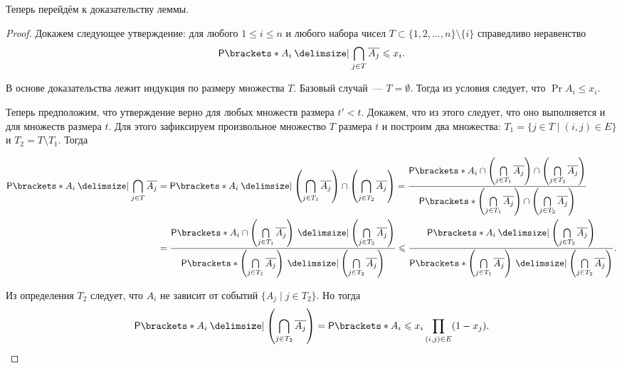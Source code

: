 Теперь перейдём к доказательству леммы.
\begin{proof}
    Докажем следующее утверждение: для любого \(1 \leq i \leq n\) и любого набора чисел \(T \subset \{1, 2, \dots, n\} \setminus \{i\}\) справедливо неравенство \[\Pr{A_i \given \bigcap_{j \in T} \overline{A_j}} \leq x_i.\]
    
    В основе доказательства лежит индукция по размеру множества \(T\). Базовый случай~--- \(T = \emptyset\). Тогда из условия следует, что \(\Pr{A_i} \leq x_i\).
    
    Теперь предположим, что утверждение верно для любых множеств размера \(t' < t\). Докажем, что из этого следует, что оно выполняется и для множеств размера \(t\). Для этого зафиксируем произвольное множество \(T\) размера \(t\) и построим два множества: \(T_1 = \{j \in T \mid (i, j) \in E\}\) и \(T_2 = T \setminus T_1\). Тогда
    
    \[\begin{aligned}
    \Pr{A_i \given \bigcap_{j \in T} \overline{A_j}} &= \Pr{A_i \given \left(\bigcap_{j \in T_1} \overline{A_j}\right) \cap \left(\bigcap_{j \in T_2} \overline{A_j}\right)}
    = \frac{\Pr{A_i \cap \left(\bigcap\limits_{j \in T_1} \overline{A_j}\right) \cap \left(\bigcap\limits_{j \in T_2} \overline{A_j}\right)}}{\Pr{\left(\bigcap\limits_{j \in T_1} \overline{A_j}\right) \cap \left(\bigcap\limits_{j \in T_2} \overline{A_j}\right)}} \\
    &= \frac{\Pr{A_i \cap \left(\bigcap\limits_{j \in T_1} \overline{A_j}\right) \given \left(\bigcap\limits_{j \in T_2} \overline{A_j}\right)}}{\Pr{\left(\bigcap\limits_{j \in T_1} \overline{A_j}\right) \given \left(\bigcap\limits_{j \in T_2} \overline{A_j}\right)}} \leq \frac{\Pr{A_i \given \left(\bigcap\limits_{j \in T_2} \overline{A_j}\right)}}{\Pr{\left(\bigcap\limits_{j \in T_1} \overline{A_j}\right) \given \left(\bigcap\limits_{j \in T_2} \overline{A_j}\right)}}.
    \end{aligned}\]
    
    Из определения \(T_2\) следует, что \(A_i\) не зависит от событий \(\{A_j \mid j \in T_2\}\). Но тогда
    \[\Pr{A_i \given \left(\bigcap\limits_{j \in T_2} \overline{A_j}\right)} = \Pr{A_i} \leq x_i \prod\limits_{(i, j) \in E} (1 - x_j).\]
    

\end{proof}
